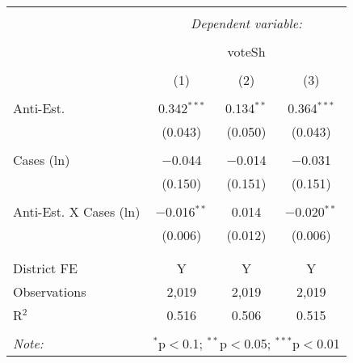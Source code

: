 
\begin{table}[!htbp] \centering 
  \caption{} 
  \label{} 
\begin{tabular}{@{\extracolsep{5pt}}lccc} 
\\[-1.8ex]\hline 
\hline \\[-1.8ex] 
 & \multicolumn{3}{c}{\textit{Dependent variable:}} \\ 
\cline{2-4} 
\\[-1.8ex] & \multicolumn{3}{c}{voteSh} \\ 
\\[-1.8ex] & (1) & (2) & (3)\\ 
\hline \\[-1.8ex] 
 Anti-Est. & 0.342$^{***}$ & 0.134$^{**}$ & 0.364$^{***}$ \\ 
  & (0.043) & (0.050) & (0.043) \\ 
  & & & \\ 
 Cases (ln) & $-$0.044 & $-$0.014 & $-$0.031 \\ 
  & (0.150) & (0.151) & (0.151) \\ 
  & & & \\ 
 Anti-Est. X Cases (ln) & $-$0.016$^{**}$ & 0.014 & $-$0.020$^{**}$ \\ 
  & (0.006) & (0.012) & (0.006) \\ 
  & & & \\ 
\hline \\[-1.8ex] 
District FE & Y & Y & Y \\ 
Observations & 2,019 & 2,019 & 2,019 \\ 
R$^{2}$ & 0.516 & 0.506 & 0.515 \\ 
\hline 
\hline \\[-1.8ex] 
\textit{Note:}  & \multicolumn{3}{r}{$^{*}$p$<$0.1; $^{**}$p$<$0.05; $^{***}$p$<$0.01} \\ 
\end{tabular} 
\end{table} 
